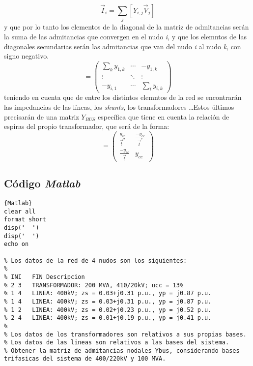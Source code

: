 \documentclass[a4paper,10pt,titlepage,oneside]{article}
\begin{document}
{\begin{equation}
    \vec{I}_i = \sum_{j} [Y_{i,j}\vec{V}_j] 
\end{equation}
y que por lo tanto los elementos de la diagonal de la matriz de admitancias serán la suma de las admitancias que convergen en el nudo \textit{i}, y que los elemntos de las diagonales secundarias serán las admitancias que van del nudo \textit{i} al nudo \textit{k}, con signo negativo.
\begin{equation}
    [Y_{BUS}] = \begin{pmatrix}
    \sum_{k} y_{1,k} & \cdots & -y_{1,k}\\
    \vdots & \ddots & \vdots \\
    -y_{i,1} & \cdots & \sum_{i} y_{i,k}
    \end{pmatrix}
\end{equation}
teniendo en cuenta que de entre los distintos elemntos de la red se encontrarán las impedancias de las líneas, los \textit{shunts}, los transformadores \dots Estos últimos precisarán de una matriz $Y_{BUS}$ específica que tiene en cuenta la relación de espiras del propio transformador, que será de la forma:
\begin{equation}
    [Y_{BUS}^{trafo}] = \begin{pmatrix}
    \frac{y_{cc}}{\vec{t}^2} &  \frac{-y_{cc}}{\vec{t}^*}\\
    \frac{-y_{cc}}{\vec{t}} & y_{cc}
    \end{pmatrix}
\end{equation}
\subsection{Código \textit{Matlab}}
\lstset{language=Matlab, breaklines=true}
\begin{lstlisting}[frame=lines]{Matlab}
clear all
format short
disp('  ')
disp('  ')
echo on

% Los datos de la red de 4 nudos son los siguientes:
% 
% INI	FIN	Descripcion
% 2	3	TRANSFORMADOR: 200 MVA, 410/20kV; ucc = 13%
% 1	4	LINEA: 400kV; zs = 0.03+j0.31 p.u., yp = j0.87 p.u.
% 1	4	LINEA: 400kV; zs = 0.03+j0.31 p.u., yp = j0.87 p.u.
% 1	2	LINEA: 400kV; zs = 0.02+j0.23 p.u., yp = j0.52 p.u.
% 2	4	LINEA: 400kV; zs = 0.01+j0.19 p.u., yp = j0.41 p.u.
% 
% Los datos de los transformadores son relativos a sus propias bases.
% Los datos de las lineas son relativos a las bases del sistema.
% Obtener la matriz de admitancias nodales Ybus, considerando bases trifasicas del sistema de 400/220kV y 100 MVA.


\end{lstlisting}}
\end{document}
